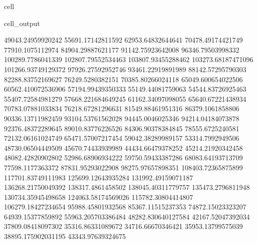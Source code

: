 \documentclass[letterpaper,10pt,english]{jupyterBook}
\begin{document}
\begin{sphinxuseclass}{cell}
\begin{sphinxVerbatimOutput}
\begin{sphinxuseclass}{cell_output}
\begin{sphinxVerbatim}[commandchars=\\\{\}]
49043.24959920242  55691.17142811592  62953.64832644641  70478.49174421749  77910.1075112974  84904.29887621177  91142.75923642008  96346.79503998332  100289.7786041339  102807.79552534463  103807.93455288462  103273.68187471096  101266.93749129372  97926.27592952746  93461.22919891989  88142.57295790303  82288.83752169627  76249.5280382151  70385.80266024118  65049.600654022506  60562.410072536906  57194.99439350333  55149.44081759063  54544.83726925463  55407.72584981279  57668.221684649245  61162.34097098055  65640.67221438934  70783.07881033834  76218.67281296631  81549.88461951316  86379.1061858806  90336.13711982459  93104.53761562028  94445.0046025346  94214.04184073878  92376.48372289645  89010.83776226526  84306.90378384845  78555.6725240581  72132.06161024749  65471.57007217454  59042.38289989157  53314.7992949506  48730.06504449509  45670.74433939989  44434.66479378252  45214.21920342458  48082.42820902802  52986.68906934222  59750.59433387286  68083.64193713709  77598.1177363372  87831.95293022908  98275.97657898351  108403.72365875899  117701.83749111983  125699.12643935284  131992.49159071187  136268.21750049392  138317.4861458502  138045.40311779757  135473.2796811948  130734.35945498658  124063.58174569026  115782.30804414807  106279.18427234654  95988.45801932568  85367.11515237353  74872.15023323207  64939.15377859892  55963.205703386484  48282.830640127584  42167.52047392034  37809.08418097302  35316.86331089672  34716.66670346421  35953.13799575039  38895.175902031195  43343.97639324675  
\end{sphinxVerbatim}

\end{sphinxuseclass}\end{sphinxVerbatimOutput}

\end{sphinxuseclass}
\end{document}
